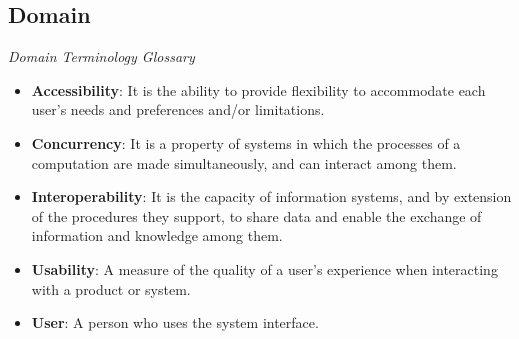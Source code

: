 \documentclass[11pt,a4paper]{article}
\begin{document}

\subsection{Domain}
\textit{Domain Terminology Glossary}\\
\begin{itemize}
\item \textbf{Accessibility}: It is the ability to provide flexibility to accommodate each user's needs and preferences and/or limitations.
\item \textbf{Concurrency}: It is a property of systems in which the processes of a computation are made simultaneously, and can interact among them.
\item \textbf{Interoperability}: It is the capacity of information systems, and by extension of the procedures they support, to share data and enable the exchange of information and knowledge among them.
\item \textbf{Usability}: A measure of the quality of a user's experience when interacting with a product or system.
\item \textbf{User}: A person who uses the system interface.
\end{itemize}
\end{document}
